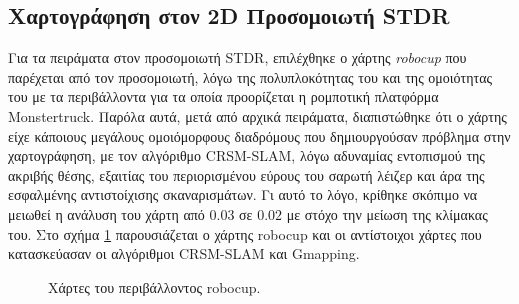 \subsection{Χαρτογράφηση στον 2D Προσομοιωτή STDR} \label{ssec:stdr_slam}
Για τα πειράματα στον προσομοιωτή STDR, επιλέχθηκε ο χάρτης \textit{robocup} που παρέχεται από τον προσομοιωτή, λόγω της πολυπλοκότητας του και της ομοιότητας του με τα περιβάλλοντα για τα οποία προορίζεται η ρομποτική πλατφόρμα Monstertruck. Παρόλα αυτά, μετά από αρχικά πειράματα, διαπιστώθηκε ότι ο χάρτης είχε κάποιους μεγάλους ομοιόμορφους διαδρόμους που δημιουργούσαν πρόβλημα στην χαρτογράφηση, με τον αλγόριθμο CRSM-SLAM, λόγω αδυναμίας εντοπισμού της ακριβής θέσης, εξαιτίας του περιορισμένου εύρους του σαρωτή λέιζερ και άρα της εσφαλμένης αντιστοίχισης σκαναρισμάτων. Γι αυτό το λόγο, κρίθηκε σκόπιμο να μειωθεί η ανάλυση του χάρτη από $0.03$ σε $0.02$ με στόχο την μείωση της κλίμακας του. Στο σχήμα \ref{fig:stdr_robocup} παρουσιάζεται ο χάρτης robocup και οι αντίστοιχοι χάρτες που κατασκεύασαν οι αλγόριθμοι CRSM-SLAM και Gmapping.

\begin{figure}[!ht]
	\centering
	\caption{Χάρτες του περιβάλλοντος robocup.}
	\label{fig:stdr_robocup}
\end{figure}

